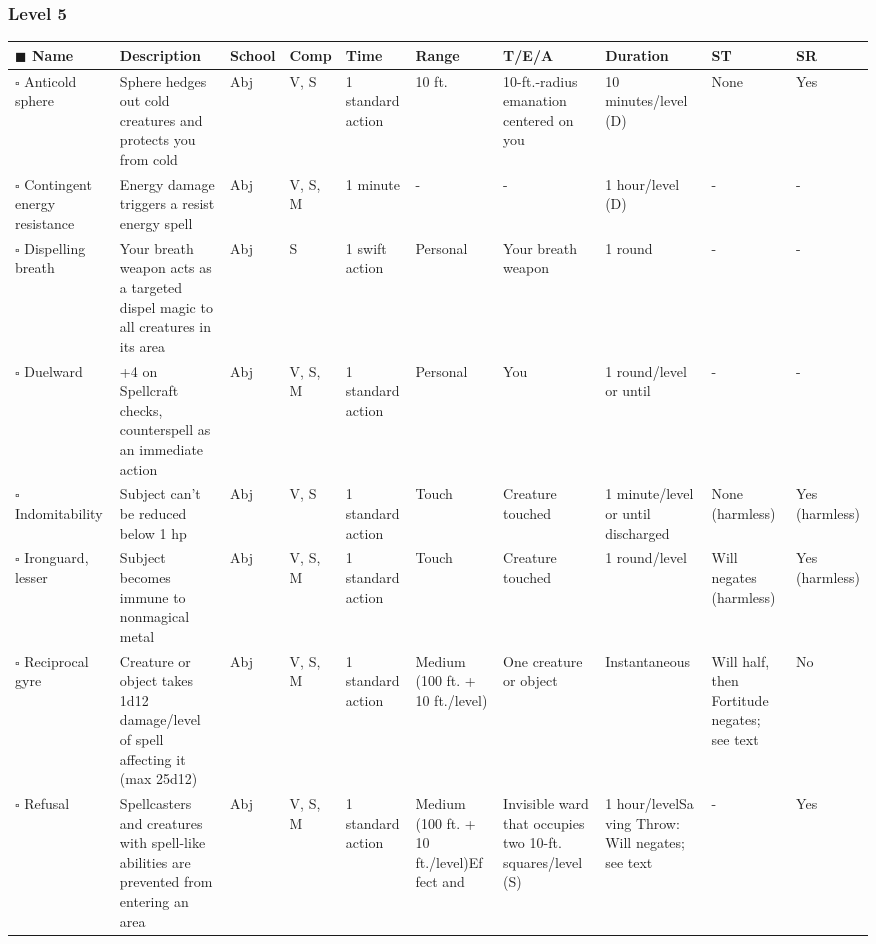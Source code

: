 \documentclass[12pt, a4paper]{article}
\begin{document}
\begin{center}
  \subsubsection*{Level 5}
  \begin{longtable}[H]{ p{8em} p{15em} p{2em} p{5em} p{6em} p{6em} p{10em} p{6em} p{5em} p{2em} }
    \(\blacksquare\) \textbf{Name} & \textbf{Description} & \textbf{School} & \textbf{Comp} & \textbf{Time} & \textbf{Range} & \textbf{T/E/A} & \textbf{Duration} & \textbf{ST} & \textbf{SR}\\
    \endhead
    \(\square\) Anticold sphere & Sphere hedges out cold creatures and protects you from cold & Abj & V, S & 1 standard action & 10 ft. & 10-ft.-radius emanation centered on you & 10 minutes/level (D) & None & Yes\\
    \(\square\) Contingent energy resistance & Energy damage triggers a resist energy spell & Abj & V, S, M & 1 minute & - & - & 1 hour/level (D) & - & -\\
    \(\square\) Dispelling breath & Your breath weapon acts as a targeted dispel magic to all creatures in its area & Abj & S & 1 swift action & Personal & Your breath weapon & 1 round & - & -\\
    \(\square\) Duelward & +4 on Spellcraft checks, counterspell as an immediate action & Abj & V, S, M & 1 standard action & Personal & You & 1 round/level or until  & - & -\\
    \(\square\) Indomitability & Subject can’t be reduced below 1 hp & Abj & V, S & 1 standard action & Touch & Creature touched & 1 minute/level or until discharged & None (harmless) & Yes (harmless)\\
    \(\square\) Ironguard, lesser & Subject becomes immune to nonmagical metal & Abj & V, S, M & 1 standard action & Touch & Creature touched & 1 round/level & Will negates (harmless) & Yes (harmless)\\
    \(\square\) Reciprocal gyre & Creature or object takes 1d12 damage/level of spell affecting it (max 25d12) & Abj & V, S, M & 1 standard action & Medium (100 ft. + 10 ft./level) & One creature or object & Instantaneous & Will half, then Fortitude negates; see text & No\\
    \(\square\) Refusal & Spellcasters and creatures with spell-like abilities are prevented from entering an area & Abj & V, S, M & 1 standard action & Medium (100 ft. + 10 ft./level)Ef fect and  & Invisible ward that occupies two 10-ft. squares/level (S) & 1 hour/levelSa ving Throw: Will negates; see text & - & Yes\\

\end{longtable}
\end{center}
\end{document}
